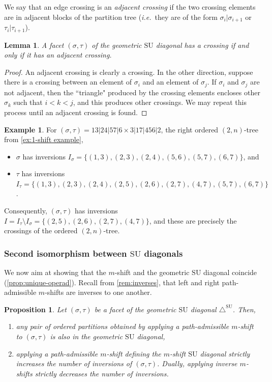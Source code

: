 \documentclass{amsart}
\newcommand{\darkblue}{\color{darkblue}} %
\newtheorem{proposition}[theorem]{Proposition}
\newtheorem{lemma}[theorem]{Lemma}
\theoremstyle{definition}
\newtheorem{example}[theorem]{Example}
\newcommand{\ie}{\textit{i.e.}~} %
\newcommand{\defn}[1]{\textsl{\darkblue #1}} %
\newcommand{\SU}{\mathrm{SU}}
\newcommand{\SUD}{\triangle^{\mathrm{SU}}}
\begin{document}
We say that an edge crossing is an \defn{adjacent crossing} if the two crossing elements are in adjacent blocks of the partition tree (\ie they are of the form $\sigma_i|\sigma_{i+1}$ or $\tau_i|\tau_{i+1}$).

\begin{lemma}
\label{lem:adjacent-crossing}
A facet $(\sigma,\tau)$ of the geometric $\SU$ diagonal has a crossing if and only if it has an adjacent crossing.
\end{lemma}

\begin{proof}
An adjacent crossing is clearly a crossing. 
In the other direction, suppose there is a crossing between an element of $\sigma_i$ and an element of $\sigma_j$. 
If $\sigma_i$ and $\sigma_j$ are not adjacent, then the ``triangle" produced by the crossing elements encloses other $\sigma_k$ such that $i<k<j$, and this produces other crossings. We may repeat this process until an adjacent crossing is found.
\end{proof}

\begin{example}
For $(\sigma,\tau) = 13|24|57|6 \times 3|17|456|2$, the right ordered $(2,n)$-tree from \cref{ex:1-shift example},
\begin{itemize}
    \item $\sigma$ has inversions $I_\sigma = \{(1,3),(2,3),(2,4),(5,6),(5,7),(6,7)\}$, and
    \item $\tau$ has inversions $I_\tau = \{(1,3), (2,3), (2,4), (2,5), (2,6), (2,7), (4,7), (5,7), (6,7)\}$.
\end{itemize}
Consequently, $(\sigma,\tau)$ has inversions $I = I_\tau \setminus I_\sigma = \{(2,5), (2,6), (2,7), (4,7)\}$, and these are precisely the crossings of the ordered $(2,n)$-tree.
\end{example}


\subsubsection{Second isomorphism between $\SU$ diagonals}
\label{sec:Iso m-shifts to IJ}

We now aim at showing that the $m$-shift and the geometric $\SU$ diagonal coincide (\cref{prop:unique-operad}).
Recall from \cref{rem:inverses}, that left and right path-admissible $m$-shifts are inverses to one another. 

\begin{proposition} 
\label{lem:IJ-closed-under-shifts}
Let $(\sigma,\tau)$ be a facet of the geometric $\SU$ diagonal $\SUD$.
Then,
\begin{enumerate}
\item any pair of ordered partitions obtained by applying a path-admissible $m$-shift to $(\sigma,\tau)$ is also in the geometric $\SU$ diagonal,
\item applying a path-admissible $m$-shift defining the $m$-shift $\SU$ diagonal strictly increases the number of inversions of $(\sigma,\tau)$.
Dually, applying inverse $m$-shifts strictly decreases the number of inversions.
\end{enumerate}
\end{proposition}
\end{document}
